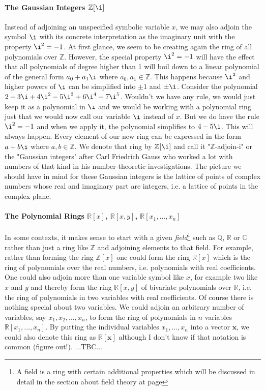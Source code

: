 \paragraph{The Gaussian Integers $\mathbb{Z}[\i]$}
Instead of adjoining an unspecified symbolic variable $x$, we may also adjoin the symbol $\i$ with its concrete interpretation as the imaginary unit with the property $\i^2 = -1$. At first glance, we seem to be creating again the ring of all polynomials over $\mathbb{Z}$. However, the special property $\i^2 = -1$ will have the effect that all polynomials of degree higher than 1 will boil down to a linear polynomial of the general form $a_0 + a_1 \i$ where $a_0,a_1 \in \mathbb{Z}$. This happens because $\i^2$ and higher powers of $\i$ can be simplified into $\pm 1$ and $\pm \i$. Consider the polynomial $2 - 3 \i + 4 \i^2 - 5 \i^3 + 6 \i^4 - 7 \i^5$. Wouldn't we have any rule, we would just keep it as a polynomial in $\i$ and we would be working with a polynomial ring just that we would now call our variable $\i$ instead of $x$. But we do have the rule $\i^2 = -1$ and when we apply it, the polynomial simplifies to $4 - 5 \i$. This will always happen. Every element of our new ring can be expressed in the form $a + b \i$ where $a,b \in \mathbb{Z}$. We denote that ring by $\mathbb{Z}[\i]$ and call it "$\mathbb{Z}$-adjoin-i" or the "Gaussian integers" after Carl Friedrich Gauss who worked a lot with numbers of that kind in his number-theoretic investigations. The picture we should have in mind for these Gaussian integers is the lattice of points of complex numbers whose real and imaginary part are integers, i.e. a lattice of points in the complex plane.

\paragraph{The Polynomial Rings $\mathbb{R}[x]$, $\mathbb{R}[x,y]$, $\mathbb{R}[x_1,\ldots,x_n]$}
In some contexts, it makes sense to start with a given \emph{field}\footnote{A field is a ring with certain additional properties which will be discussed in detail in the section about field theory at page \pageref{Sec:FieldTheory}} such as $\mathbb{Q}$, $\mathbb{R}$ or $\mathbb{C}$ rather than just a ring like $\mathbb{Z}$ and adjoining elements to that field. For example, rather than forming the ring $\mathbb{Z}[x]$ one could form the ring $\mathbb{R}[x]$ which is the ring of polynomials over the real numbers, i.e. polynomials with real coefficients. One could also adjoin more than one variable symbol like $x$, for example two like $x$ and $y$ and thereby form the ring $\mathbb{R}[x,y]$ of bivariate polynomials over $\mathbb{R}$, i.e. the ring of polynomials in two variables with real coefficients. Of course there is nothing special about two variables. We could adjoin an arbitrary number of variables, say $x_1,x_2, \ldots, x_n$, to form the ring of polynomials in $n$ variables $\mathbb{R}[x_1,\ldots,x_n]$. By putting the individual variables $x_1,\ldots,x_n$ into a vector $\mathbf{x}$, we could also denote this ring as $\mathbb{R}[\mathbf{x}]$ although I don't know if that notation is common (figure out!).  ...TBC...


